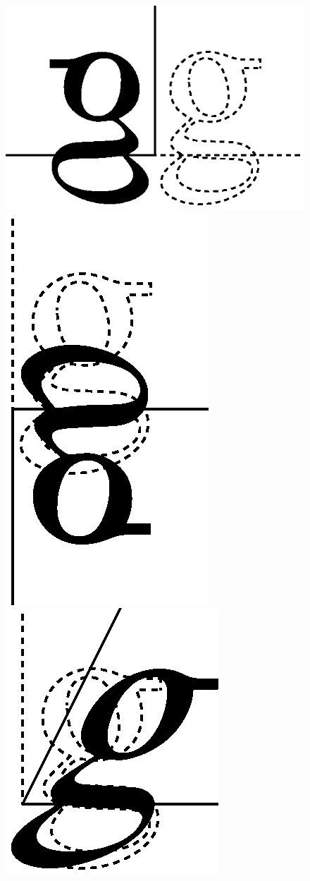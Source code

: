 \begin{figure}[t]
\hfill
\includegraphics[scale=0.5]{mirrorh.eps}
\hfill
\includegraphics[scale=0.5]{mirrorv.eps}
\hfill
\includegraphics[scale=0.5]{shearh.eps}

\end{figure}

